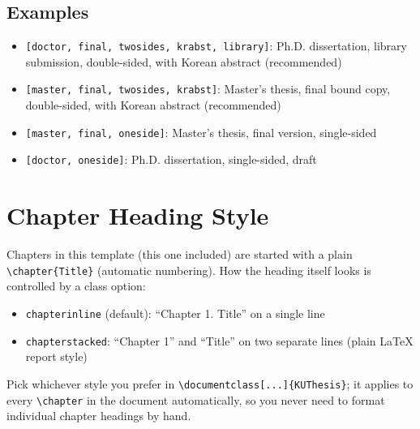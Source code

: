 \subsection{Examples}

\begin{itemize}
    \item \verb|[doctor, final, twosides, krabst, library]|: Ph.D. dissertation, library submission, double-sided, with Korean abstract (recommended)
    \item \verb|[master, final, twosides, krabst]|: Master's thesis, final bound copy, double-sided, with Korean abstract (recommended)
    \item \verb|[master, final, oneside]|: Master's thesis, final version, single-sided
    \item \verb|[doctor, oneside]|: Ph.D. dissertation, single-sided, draft
\end{itemize}

\section{Chapter Heading Style}
Chapters in this template (this one included) are started with a plain \verb|\chapter{Title}| (automatic numbering). How the heading itself looks is controlled by a class option:
\begin{itemize}
  \item \texttt{chapterinline} (default): ``Chapter 1. Title'' on a single line
  \item \texttt{chapterstacked}: ``Chapter 1'' and ``Title'' on two separate lines (plain \LaTeX{} report style)
\end{itemize}
Pick whichever style you prefer in \verb|\documentclass[...]{KUThesis}|; it applies to every \verb|\chapter| in the document automatically, so you never need to format individual chapter headings by hand.


